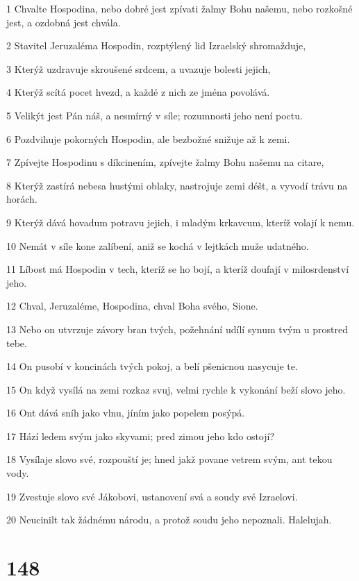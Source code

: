 \par 1 Chvalte Hospodina, nebo dobré jest zpívati žalmy Bohu našemu, nebo rozkošné jest, a ozdobná jest chvála.
\par 2 Stavitel Jeruzaléma Hospodin, rozptýlený lid Izraelský shromažduje,
\par 3 Kterýž uzdravuje skroušené srdcem, a uvazuje bolesti jejich,
\par 4 Kterýž scítá pocet hvezd, a každé z nich ze jména povolává.
\par 5 Velikýt jest Pán náš, a nesmírný v síle; rozumnosti jeho není poctu.
\par 6 Pozdvihuje pokorných Hospodin, ale bezbožné snižuje až k zemi.
\par 7 Zpívejte Hospodinu s díkcinením, zpívejte žalmy Bohu našemu na citare,
\par 8 Kterýž zastírá nebesa hustými oblaky, nastrojuje zemi déšt, a vyvodí trávu na horách.
\par 9 Kterýž dává hovadum potravu jejich, i mladým krkavcum, kteríž volají k nemu.
\par 10 Nemát v síle kone zalíbení, aniž se kochá v lejtkách muže udatného.
\par 11 Líbost má Hospodin v tech, kteríž se ho bojí, a kteríž doufají v milosrdenství jeho.
\par 12 Chval, Jeruzaléme, Hospodina, chval Boha svého, Sione.
\par 13 Nebo on utvrzuje závory bran tvých, požehnání udílí synum tvým u prostred tebe.
\par 14 On pusobí v koncinách tvých pokoj, a belí pšenicnou nasycuje te.
\par 15 On když vysílá na zemi rozkaz svuj, velmi rychle k vykonání beží slovo jeho.
\par 16 Ont dává sníh jako vlnu, jíním jako popelem posýpá.
\par 17 Hází ledem svým jako skyvami; pred zimou jeho kdo ostojí?
\par 18 Vysílaje slovo své, rozpouští je; hned jakž povane vetrem svým, ant tekou vody.
\par 19 Zvestuje slovo své Jákobovi, ustanovení svá a soudy své Izraelovi.
\par 20 Neucinilt tak žádnému národu, a protož soudu jeho nepoznali. Halelujah.

\chapter{148}

